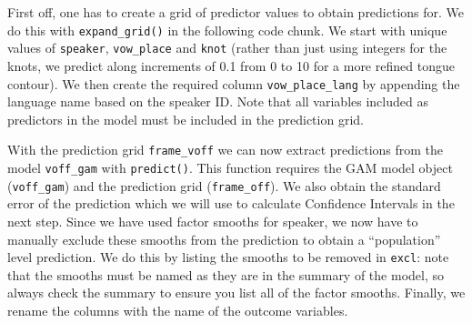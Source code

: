 \documentclass[
  man,
  longtable,
  nolmodern,
  notxfonts,
  notimes,
  colorlinks=true,linkcolor=blue,citecolor=blue,urlcolor=blue]{apa7}
\newenvironment{Shaded}{\begin{snugshade}}{\end{snugshade}}
\newcommand{\AttributeTok}[1]{\textcolor[rgb]{0.40,0.45,0.13}{#1}}
\newcommand{\CommentTok}[1]{\textcolor[rgb]{0.37,0.37,0.37}{#1}}
\newcommand{\DecValTok}[1]{\textcolor[rgb]{0.68,0.00,0.00}{#1}}
\newcommand{\FloatTok}[1]{\textcolor[rgb]{0.68,0.00,0.00}{#1}}
\newcommand{\FunctionTok}[1]{\textcolor[rgb]{0.28,0.35,0.67}{#1}}
\newcommand{\NormalTok}[1]{\textcolor[rgb]{0.00,0.23,0.31}{#1}}
\newcommand{\OtherTok}[1]{\textcolor[rgb]{0.00,0.23,0.31}{#1}}
\newcommand{\SpecialCharTok}[1]{\textcolor[rgb]{0.37,0.37,0.37}{#1}}
\newcommand{\StringTok}[1]{\textcolor[rgb]{0.13,0.47,0.30}{#1}}
\begin{document}
First off, one has to create a grid of predictor values to obtain
predictions for. We do this with \texttt{expand\_grid()} in the
following code chunk. We start with unique values of \texttt{speaker},
\texttt{vow\_place} and \texttt{knot} (rather than just using integers
for the knots, we predict along increments of 0.1 from 0 to 10 for a
more refined tongue contour). We then create the required column
\texttt{vow\_place\_lang} by appending the language name based on the
speaker ID. Note that all variables included as predictors in the model
must be included in the prediction grid.

\begin{Shaded}
\end{Shaded}

With the prediction grid \texttt{frame\_voff} we can now extract
predictions from the model \texttt{voff\_gam} with \texttt{predict()}.
This function requires the GAM model object (\texttt{voff\_gam}) and the
prediction grid (\texttt{frame\_off}). We also obtain the standard error
of the prediction which we will use to calculate Confidence Intervals in
the next step. Since we have used factor smooths for speaker, we now
have to manually exclude these smooths from the prediction to obtain a
``population'' level prediction. We do this by listing the smooths to be
removed in \texttt{excl}: note that the smooths must be named as they
are in the summary of the model, so always check the summary to ensure
you list all of the factor smooths. Finally, we rename the columns with
the name of the outcome variables.
\end{document}
